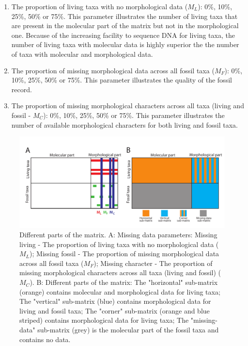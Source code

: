 \documentclass[12pt,letterpaper]{article}
\begin{document}
\begin{enumerate}
\item{The proportion of living taxa with no morphological data ($M_{L}$): 0\%, 10\%, 25\%, 50\% or 75\%.}
This parameter illustrates the number of living taxa that are present in the molecular part of the matrix but not in the morphological one.
Because of the increasing facility to sequence DNA for living taxa, the number of living taxa with molecular data is highly superior the the number of taxa with molecular and morphological data.
\item{The proportion of missing morphological data across all fossil taxa ($M_{F}$): 0\%, 10\%, 25\%, 50\% or 75\%.}
This parameter illustrates the quality of the fossil record. 
\item{The proportion of missing morphological characters across all taxa (living and fossil - $M_{C}$): 0\%, 10\%, 25\%, 50\% or 75\%. }
This parameter illustrates the number of available morphological characters for both living and fossil taxa.
\end{enumerate}

\begin{figure}
\centering
\includegraphics[keepaspectratio=true]{Figures/TEM_Fig_missingData.pdf}
\caption{Different parts of the matrix. %
A: Missing data parameters:
Missing living - The proportion of living taxa with no morphological data ($M_{L}$);
Missing fossil - The proportion of missing morphological data across all fossil taxa ($M_{F}$);
Missing character - The proportion of missing morphological characters across all taxa (living and fossil) ($M_{C}$).
B: Different parts of the matrix:
The "horizontal" sub-matrix (orange) contains molecular and morphological data for living taxa;
The "vertical" sub-matrix (blue) contains morphological data for living and fossil taxa;
The "corner" sub-matrix (orange and blue striped) contains morphological data for living taxa;
The "missing-data" sub-matrix (grey) is the molecular part of the fossil taxa and contains no data.}
\label{Fig_RemoveData}
\end{figure}
\end{document}
